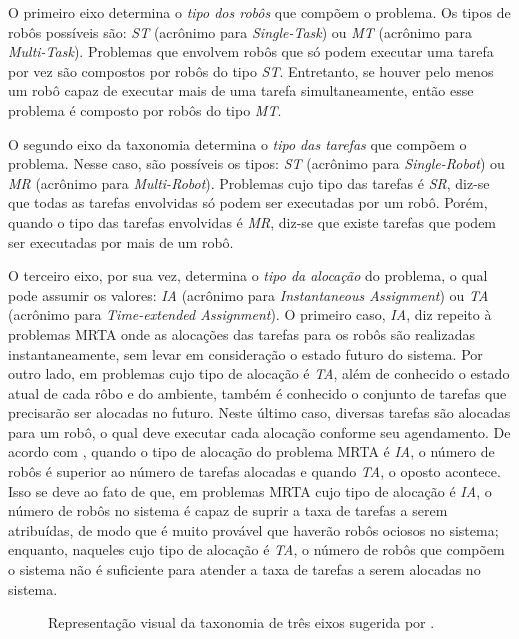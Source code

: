             O primeiro eixo determina o \textit{tipo dos robôs} que compõem o problema. Os tipos de robôs possíveis são: \textit{ST} (acrônimo para \textit{Single-Task}) ou \textit{MT} (acrônimo para \textit{Multi-Task}). Problemas que envolvem robôs que só podem executar uma tarefa por vez são compostos por robôs do tipo \textit{ST}. Entretanto, se houver pelo menos um robô capaz de executar mais de uma tarefa simultaneamente, então esse problema é composto por robôs do tipo \textit{MT}. 
            
            O segundo eixo da taxonomia determina o \textit{tipo das tarefas} que compõem o problema. Nesse caso, são possíveis os tipos: \textit{ST} (acrônimo para \textit{Single-Robot}) ou \textit{MR} (acrônimo para \textit{Multi-Robot}). Problemas cujo tipo das tarefas é \textit{SR}, diz-se que todas as tarefas envolvidas só podem ser executadas por um robô. Porém, quando o tipo das tarefas envolvidas é \textit{MR}, diz-se que existe tarefas que podem ser executadas por mais de um robô.
            
            O terceiro eixo, por sua vez, determina o \textit{tipo da alocação} do problema, o qual pode assumir os valores: \textit{IA} (acrônimo para \textit{Instantaneous Assignment}) ou \textit{TA} (acrônimo para \textit{Time-extended Assignment}). O primeiro caso, \textit{IA}, diz repeito à problemas MRTA onde as alocações das tarefas para os robôs são realizadas instantaneamente, sem levar em consideração o estado futuro do sistema. Por outro lado, em problemas cujo tipo de alocação é \textit{TA}, além de conhecido o estado atual de cada rôbo e do ambiente, também é conhecido o conjunto de tarefas que precisarão ser alocadas no futuro. Neste último caso, diversas tarefas são alocadas para um robô, o qual deve executar cada alocação conforme seu agendamento. De acordo com , quando o tipo de alocação do problema MRTA é \textit{IA}, o número de robôs é superior ao número de tarefas alocadas e quando \textit{TA}, o oposto acontece. Isso se deve ao fato de que, em problemas MRTA cujo tipo de alocação é \textit{IA}, o número de robôs no sistema é capaz de suprir a taxa de tarefas a serem atribuídas, de modo que é muito provável que haverão robôs ociosos no sistema; enquanto, naqueles cujo tipo de alocação é \textit{TA}, o número de robôs que compõem o sistema não é suficiente para atender a taxa de tarefas a serem alocadas no sistema.
            
            \begin{figure}[htb]
                \centering
                
                \caption[Representação visual da taxonomia de três eixos]{Representação visual da taxonomia de três eixos sugerida por .} \label{fig:taxomia_mrta}
            \end{figure}
            
